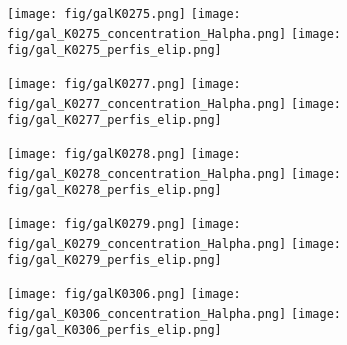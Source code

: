 \begin{figure}[!ht]
\begin{center}
\setcaptionmargin{1cm}
\texttt{[image: fig/galK0275.png]}
\texttt{[image: fig/gal\_K0275\_concentration\_Halpha.png]}
\texttt{[image: fig/gal\_K0275\_perfis\_elip.png]}
\end{center}
\end{figure}

\begin{figure}[!ht]
\begin{center}
\setcaptionmargin{1cm}
\texttt{[image: fig/galK0277.png]}
\texttt{[image: fig/gal\_K0277\_concentration\_Halpha.png]}
\texttt{[image: fig/gal\_K0277\_perfis\_elip.png]}
\end{center}
\end{figure}


\begin{figure}[!ht]
\begin{center}
\setcaptionmargin{1cm}
\texttt{[image: fig/galK0278.png]}
\texttt{[image: fig/gal\_K0278\_concentration\_Halpha.png]}
\texttt{[image: fig/gal\_K0278\_perfis\_elip.png]}
\end{center}
\end{figure}


\begin{figure}[!ht]
\begin{center}
\setcaptionmargin{1cm}
\texttt{[image: fig/galK0279.png]}
\texttt{[image: fig/gal\_K0279\_concentration\_Halpha.png]}
\texttt{[image: fig/gal\_K0279\_perfis\_elip.png]}
\end{center}
\end{figure}


\begin{figure}[!ht]
\begin{center}
\setcaptionmargin{1cm}
\texttt{[image: fig/galK0306.png]}
\texttt{[image: fig/gal\_K0306\_concentration\_Halpha.png]}
\texttt{[image: fig/gal\_K0306\_perfis\_elip.png]}
\end{center}
\end{figure}


